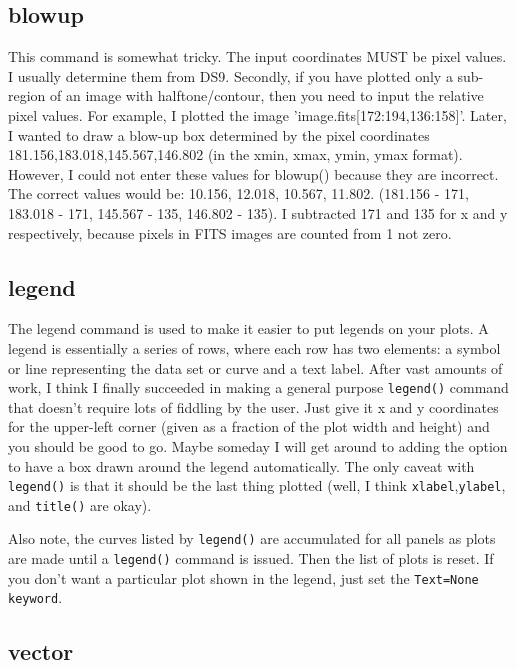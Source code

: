\documentclass[12pt]{article}
\begin{document}
\subsection{blowup}

This command is somewhat tricky.  The input coordinates MUST be pixel values. I
usually determine them from DS9.  Secondly,  if you have plotted only a
sub-region of an image with halftone/contour, then you need to input the
relative pixel values.  For example, I plotted the image
'image.fits[172:194,136:158]'.  Later, I wanted to draw a blow-up box determined
by the pixel coordinates 181.156,183.018,145.567,146.802 (in the xmin, xmax,
ymin, ymax format).  However, I could not enter these values for blowup()
because they are incorrect.  The correct values would be: 10.156, 12.018,
10.567, 11.802.  (181.156 - 171, 183.018 - 171, 145.567 - 135, 146.802 - 135).
I subtracted 171 and 135 for x and y respectively, because pixels in FITS images
are counted from 1 not zero.

\subsection{legend}

The legend command is used to make it easier to put legends on your plots. A
legend is essentially a series of rows, where each row has two elements: a
symbol or line representing the data set or curve and a text label. After vast
amounts of work, I think I finally succeeded in making a general purpose
\texttt{legend()} command that doesn't require lots of fiddling by the user.
Just give it x and y coordinates for the upper-left corner (given as a fraction
of the plot width and height) and you should be good to go. Maybe someday I will
get around to adding the option to have a box drawn around the legend
automatically. The only caveat with \texttt{legend()} is that it should be the
last thing plotted (well, I think \texttt{xlabel},\texttt{ylabel}, and
\texttt{title()} are okay).

Also note, the curves listed by \texttt{legend()} are accumulated for all
panels as plots are made until a \texttt{legend()} command is issued.  Then
the list of plots is reset.  If you don't want a particular plot shown in the
legend, just set the \texttt{Text=None keyword}.

\subsection{vector}
\end{document}
